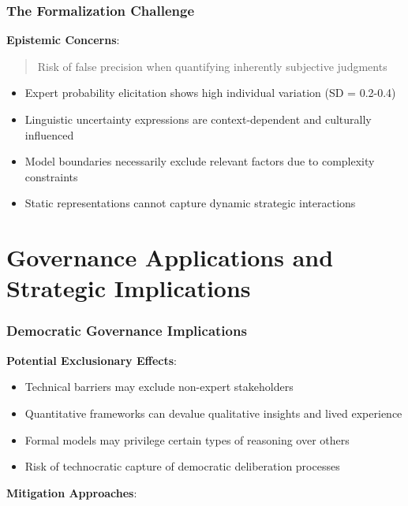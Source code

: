 \documentclass[
  11pt,
  letterpaper,
]{book}
\providecommand{\tightlist}{%
  \setlength{\itemsep}{0pt}\setlength{\parskip}{0pt}}
\begin{document}
\subsubsection{The Formalization
Challenge}\label{sec-formalization-challenge}

\textbf{Epistemic Concerns}:

\begin{quote}
Risk of false precision when quantifying inherently subjective judgments
\end{quote}

\begin{itemize}
\tightlist
\item
  Expert probability elicitation shows high individual variation (SD =
  0.2-0.4)
\item
  Linguistic uncertainty expressions are context-dependent and
  culturally influenced
\item
  Model boundaries necessarily exclude relevant factors due to
  complexity constraints
\item
  Static representations cannot capture dynamic strategic interactions
\end{itemize}

\section{Governance Applications and Strategic
Implications}\label{sec-governance-applications}

\subsubsection{Democratic Governance
Implications}\label{sec-democratic-implications}

\textbf{Potential Exclusionary Effects}:

\begin{itemize}
\tightlist
\item
  Technical barriers may exclude non-expert stakeholders
\item
  Quantitative frameworks can devalue qualitative insights and lived
  experience
\item
  Formal models may privilege certain types of reasoning over others
\item
  Risk of technocratic capture of democratic deliberation processes
\end{itemize}

\textbf{Mitigation Approaches}:
\end{document}
